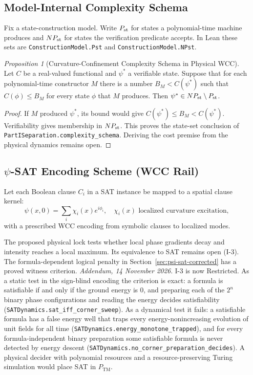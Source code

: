 \documentclass[12pt]{article}
\theoremstyle{remark}
\newtheorem{proposition}[theorem]{Proposition}
\begin{document}
\subsection{Model-Internal Complexity Schema}

Fix a state-construction model. Write $P_{\rm st}$ for states a polynomial-time
machine produces and $NP_{\rm st}$ for states the verification predicate
accepts. In Lean these sets are \texttt{ConstructionModel.Pst} and
\nolinkurl{ConstructionModel.NPst}.

\begin{proposition}[Curvature-Confinement Complexity Schema in Physical WCC]
Let $C$ be a real-valued functional and $\psi^*$ a verifiable state.
Suppose that for each polynomial-time constructor $M$ there is a number
$B_M<C(\psi^*)$ such that $C(\phi)\le B_M$ for every state $\phi$ that
$M$ produces. Then $\psi^*\in NP_{\rm st}\setminus P_{\rm st}$.
\end{proposition}
\begin{proof}
If $M$ produced $\psi^*$, its bound would give
$C(\psi^*)\le B_M<C(\psi^*)$. Verifiability gives membership in
$NP_{\rm st}$. This proves the state-set conclusion of
\nolinkurl{PartISeparation.complexity_schema}. Deriving the cost premise
from the physical dynamics remains open.
\end{proof}

\subsection{$\psi$-SAT Encoding Scheme (WCC Rail)}

Let each Boolean clause $C_i$ in a SAT instance be mapped to a spatial clause
kernel:
\begin{equation}
\psi(x, 0) = \sum_i \chi_i(x) e^{i \phi_i},
\quad \chi_i(x) \text{ localized curvature excitation},
\end{equation}
with a prescribed WCC encoding from symbolic clauses to localized modes.

The proposed physical lock tests whether local phase gradients decay and
intensity reaches a local maximum. Its equivalence to SAT remains open (I-3).
The formula-dependent logical penalty in Section~\ref{sec:psi-sat-corrected}
has a proved witness criterion.
\emph{Addendum, 14 November 2026.}  I-3 is now Restricted.  As a static
test in the sign-blind encoding the criterion is exact: a formula is
satisfiable if and only if the ground energy is $0$, and preparing each
of the $2^n$ binary phase configurations and reading the energy decides
satisfiability (\nolinkurl{SATDynamics.sat_iff_corner_sweep}).  As a
dynamical test it fails: a satisfiable formula has a false energy well
that traps every energy-nonincreasing evolution of unit fields for all
time (\nolinkurl{SATDynamics.energy_monotone_trapped}), and for every
formula-independent binary preparation some satisfiable formula is never
detected by energy descent
(\nolinkurl{SATDynamics.no_corner_preparation_decides}).  A physical
decider with polynomial resources and a resource-preserving Turing
simulation would place SAT in $P_{\mathrm{TM}}$.
\end{document}
